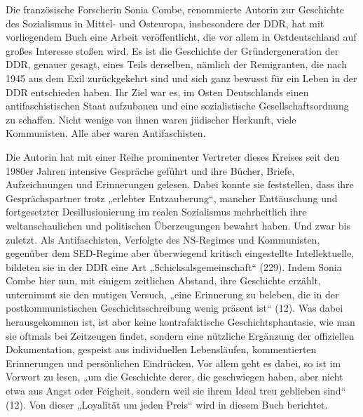 \begin{multicols*}{2}
\vfill\null\columnbreak
    
    \noindent Die französische Forscherin Sonia Combe, renommierte Autorin zur Geschichte des Sozialismus in Mittel- und Osteuropa, insbesondere der DDR, hat mit vorliegendem Buch eine Arbeit veröffentlicht, die vor allem in Ostdeutschland auf großes Interesse stoßen wird. Es ist die Geschichte der Gründergeneration der DDR, genauer gesagt, eines Teils derselben, nämlich der Remigranten, die nach 1945 aus dem Exil zurückgekehrt sind und sich ganz bewusst für ein Leben in der DDR entschieden haben. Ihr Ziel war es, im Osten Deutschlands einen antifaschistischen Staat aufzubauen und eine sozialistische Gesellschaftsordnung zu schaffen. Nicht wenige von ihnen waren jüdischer Herkunft, viele Kommunisten. Alle aber waren Antifaschisten. 

    Die Autorin hat mit einer Reihe prominenter Vertreter dieses Kreises seit den 1980er Jahren intensive Gespräche geführt und ihre Bücher, Briefe, Aufzeichnungen und Erinnerungen gelesen. Dabei konnte sie feststellen, dass ihre Gesprächspartner trotz „erlebter Entzauberung“, mancher Enttäuschung und fortgesetzter Desillusionierung im realen Sozialismus mehrheitlich ihre weltanschaulichen und politischen Überzeugungen bewahrt haben. Und zwar bis zuletzt. Als Antifaschisten, Verfolgte des NS-Regimes und Kommunisten, gegenüber dem SED-Regime aber überwiegend kritisch eingestellte Intellektuelle, bildeten sie in der DDR eine Art „Schicksalsgemeinschaft“ (229). Indem Sonia Combe hier nun, mit einigem zeitlichen Abstand, ihre Geschichte erzählt, unternimmt sie den mutigen Versuch, „eine Erinnerung zu beleben, die in der postkommunistischen Geschichtsschreibung wenig präsent ist“ (12). Was dabei herausgekommen ist, ist aber keine kontrafaktische Geschichtsphantasie, wie man sie oftmals bei Zeitzeugen findet, sondern eine nützliche Ergänzung der offiziellen Dokumentation, gespeist aus individuellen Lebensläufen, kommentierten Erinnerungen und persönlichen Eindrücken. Vor allem geht es dabei, so ist im Vorwort zu lesen, „um die Geschichte derer, die geschwiegen haben, aber nicht etwa aus Angst oder Feigheit, sondern weil sie ihrem Ideal treu geblieben sind“ (12). Von dieser „Loyalität um jeden Preis“ wird in diesem Buch berichtet. 


\end{multicols*}
